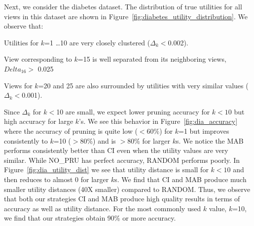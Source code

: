 Next, we consider the diabetes dataset.
The distribution of true utilities for all views in this dataset are shown in
Figure~\ref{fig:diabetes_utility_distribution}.
We observe that:
\begin{denselist}
\item Utilities for $k$=1 \ldots 10 are very closely clustered ($\Delta_k<$0.002).
\item View corresponding to $k$=15 is well separated from its neighboring views, $Delta_16 >$ 0.025
\item Views for $k$=20 and 25 are also surrounded by utilities with very 
similar values ($\Delta_k < $0.001).
\end{denselist}
Since $\Delta_k$ for $k<$10 are small, we expect lower pruning accuracy for $k<10$ but high accuracy for
large $k$'s.
We see this behavior in Figure~\ref{fig:dia_accuracy} where the accuracy of
pruning is quite low ($<60\%$) for $k$=1 but improves consistently to $k$=10 
($>80\%$) and is $>80\%$ for larger $k$s.
We notice the MAB performs consistently better than CI even when the utility
values are very similar.
While NO\_PRU has perfect accuracy, RANDOM performs poorly. 
In Figure~\ref{fig:dia_utility_dist} we see that
utility distance is small for $k<10$ and then reduces to almost 0 for larger
$k$s.
We find that CI and MAB produce much smaller utility distances (40X smaller)
compared to RANDOM.
Thus, we observe that both our strategies CI and MAB produce high quality results 
in terms of accuracy as well as utility distance. 
For the most commonly used $k$ value, $k$=10, we find that our strategies obtain 
90\% or more accuracy.



